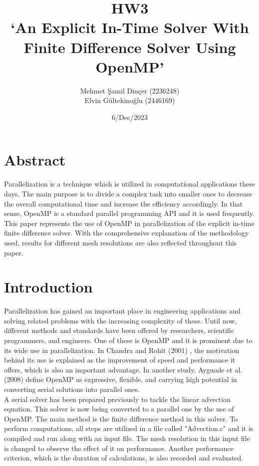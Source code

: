 \documentclass{article}
\title{HW3\\`An Explicit In-Time Solver With Finite Difference Solver Using OpenMP'}
\author{Mehmet Şamil Dinçer (2236248)\\
        Elvin Gültekinoğlu (2446169)}
\date{6/Dec/2023}
\begin{document}
\maketitle

\section{Abstract}
Parallelization is a technique which is utilized in computational applications these days. The main purpose is to divide a complex task into smaller ones to decrease the overall computational time and increase the efficiency accordingly. In that sense, OpenMP is a standard parallel programming API and it is used frequently. This paper represents the use of OpenMP in parallelization of the explicit in-time finite difference solver. With the comprehensive explanation of the methodology used, results for different mesh resolutions are also reflected throughout this paper.
\clearpage

\section{Introduction}
 Parallelization has gained an important place in engineering applications and solving related problems with the increasing complexity of these. Until now, different methods and standards have been offered by researchers, scientific programmers, and engineers. One of these is OpenMP and it is prominent due to its wide use in parallelization. In Chandra and Rohit (2001) \cite{chandra2001parallel}, the motivation behind its use is explained as the improvement of speed and performance it offers, which is also an important advantage. In another study, Ayguade et al. (2008) \cite{ayguade2008design} define OpenMP as expressive, flexible, and carrying high potential in converting serial solutions into parallel ones.\\ 

 A serial solver has been prepared previously to tackle the linear advection equation. This solver is now being converted to a parallel one by the use of OpenMP. The main method is the finite difference method in this solver. To perform computations, all steps are utilized in a file called "Advection.c" and it is compiled and run along with an input file. The mesh resolution in this input file is changed to observe the effect of it on performance. Another performance criterion, which is the duration of calculations, is also recorded and evaluated. \\
\end{document}
